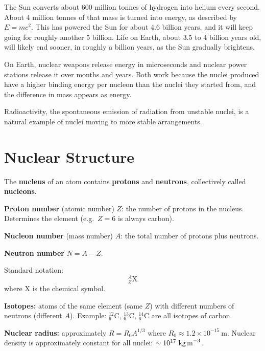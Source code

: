 The Sun converts about 600 million tonnes of hydrogen into helium
every second. About 4 million tonnes of that mass is turned into
energy, as described by $E = mc^{2}$. This has powered the Sun for
about 4.6 billion years, and it will keep going for roughly another
5 billion. Life on Earth, about 3.5 to 4 billion years old, will
likely end sooner, in roughly a billion years, as the Sun gradually
brightens.

On Earth, nuclear weapons release energy in microseconds and nuclear
power stations release it over months and years. Both work because
the nuclei produced have a higher binding energy per nucleon than the
nuclei they started from, and the difference in mass appears as
energy.

Radioactivity, the spontaneous emission of radiation from unstable
nuclei, is a natural example of nuclei moving to more stable
arrangements.

\section{Nuclear Structure}

\begin{definitionbox}
The \textbf{nucleus} of an atom contains
\textbf{protons} and \textbf{neutrons}, collectively
called \textbf{nucleons}.

\textbf{Proton number} (atomic number) $Z$: the
number of protons in the nucleus. Determines the
element (e.g.\ $Z = 6$ is always carbon).

\textbf{Nucleon number} (mass number) $A$: the total
number of protons plus neutrons.

\textbf{Neutron number} $N = A - Z$.

Standard notation:
\[
  {}^{A}_{Z}\text{X}
\]
where X is the chemical symbol.

\textbf{Isotopes:} atoms of the same element (same $Z$)
with different numbers of neutrons (different $A$).
Example: ${}^{12}_{6}\text{C}$, ${}^{13}_{6}\text{C}$,
${}^{14}_{6}\text{C}$ are all isotopes of carbon.

\textbf{Nuclear radius:} approximately
$R = R_0 A^{1/3}$ where $R_0 \approx 1.2\times10^{-15}\ \text{m}$.
Nuclear density is approximately constant for all
nuclei: $\sim 10^{17}\ \text{kg\,m}^{-3}$.
\end{definitionbox}

